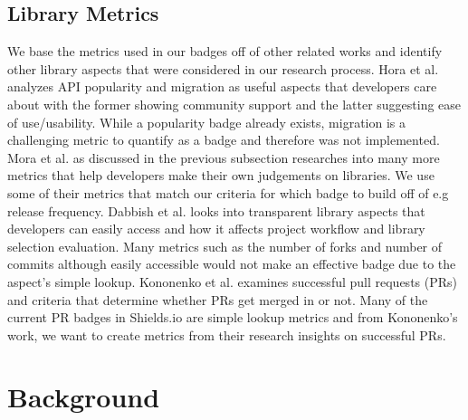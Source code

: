 \documentclass[12pt, letterpaper]{article}
\begin{document}
\subsection{Library Metrics}
We base the metrics used in our badges off of other related works and identify other library aspects
that were considered in our research process.
Hora et al. \cite{apiwave} analyzes API popularity and migration as useful aspects that developers care about
with the former showing community support and the latter suggesting ease of use/usability. 
While a popularity badge already exists, migration is a challenging metric to quantify as a badge and therefore
was not implemented.
Mora et al. \cite{metrics, empiricalmetrics} as discussed in the previous subsection researches into
many more metrics that help developers make their own judgements on libraries. We use some of their metrics
that match our criteria for which badge to build off of e.g release frequency. 
Dabbish et al. \cite{transparency} looks into transparent library aspects that developers can easily access
and how it affects project workflow and library selection evaluation. Many metrics such as the number of forks
and number of commits although easily accessible would not make an effective badge \cite{githubbadges}
due to the aspect's simple lookup. 
Kononenko et al. \cite{shopifyarticle} examines successful pull requests (PRs) and criteria that determine
whether PRs get merged in or not. Many of the current PR badges in Shields.io \cite{shields}
are simple lookup metrics and from Kononenko's work, we want
to create metrics from their research insights on successful PRs.

\section{Background}
\end{document}

